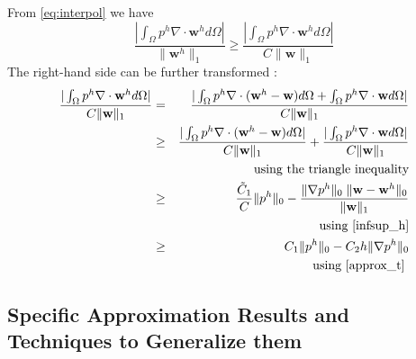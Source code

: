 \documentclass[times]{fldauth}
\newcommand{\mb}{\mathbf}
\newcommand{\bwh}{\mb w^h}
\begin{document}
From \eqref{eq:interpol} we have 
\begin{equation}
 \frac{|	 \int_{\Omega} p^h \nabla \cdot \bwh d \Omega |	}
          {\| \bwh \|_1 }
      \ge
      \frac{|	 \int_{\Omega} p^h \nabla \cdot \bwh d \Omega |	}
          {C \| \mb w \|_1 } 
\end{equation}
The right-hand side can be further transformed \cite{bochev2007stabilization}:
\begin{eqnarray}
      \frac{|	 \int_{\Omega} p^h \nabla \cdot \bwh d \Omega |	}
          {C \| \mb w \|_1 } 
      &=&
      \frac{|
      	 \int_{\Omega} p^h \nabla \cdot (\bwh-\mb w) d \Omega 
      	 +\int_{\Omega} p^h \nabla \cdot \mb w d \Omega 
	|}
        {C \| \mb w \|_1 } 
\\
      &\ge&
      \frac{|
      	 \int_{\Omega} p^h \nabla \cdot (\bwh-\mb w) d \Omega 
	|}
        {C \| \mb w \|_1 }
+
      \frac{|
      	 \int_{\Omega} p^h \nabla \cdot \mb w d \Omega 
	|}
        {C \| \mb w \|_1 }
\\
\nonumber &&\text{using the triangle inequality} 
\\
     &\ge&
     \frac{\tilde C_1}{C} \|p^h\|_0 
      -
     \frac{\|\nabla p^h\|_0 \; \|\mb w - \mb w^h\|_0}
	  {\| \mb w \|_1}
\\
\nonumber &&\text{using \eqref{infsup_h}} 
\\
     &\ge&
     C_1 \|p^h\|_0 
      -
     C_2 h \| \nabla p^h \|_0 
\\
\nonumber &&\text{using \eqref{approx_t} } 
\end{eqnarray}
\subsection{Specific Approximation Results and Techniques to Generalize them}
\end{document}
